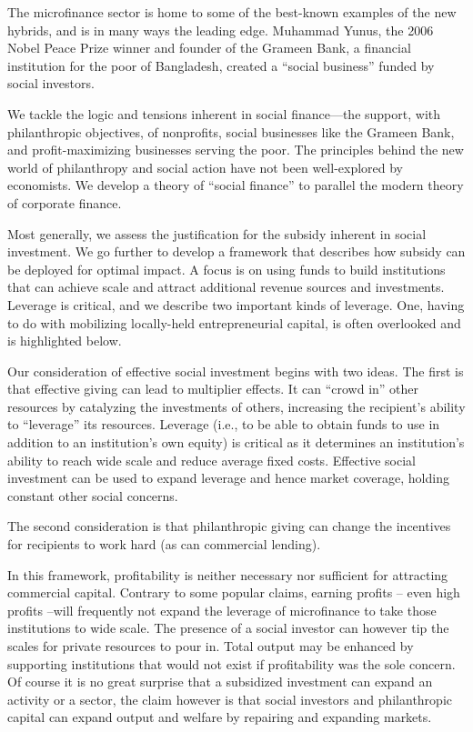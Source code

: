 \documentclass[letterpaper, 12pt]{article}
\begin{document}
The microfinance sector is home to some of the best-known examples of the new hybrids, and is in many ways the leading edge. Muhammad Yunus, the 2006 Nobel Peace Prize winner and founder of the Grameen Bank, a financial institution for the poor of Bangladesh, created a ``social business'' funded by social investors.

We tackle the logic and tensions inherent in social finance---the support, with philanthropic objectives, of nonprofits, social businesses
like the Grameen Bank, and profit-maximizing businesses serving the poor. The principles behind the new world of philanthropy and social
action have not been well-explored by economists. We develop a theory of ``social finance'' to parallel the modern theory of corporate finance.


Most generally, we assess the justification for the subsidy inherent in social investment. We go further to develop a framework that describes
how subsidy can be deployed for optimal impact. A focus is on using funds to build institutions that can achieve scale and attract additional revenue sources and investments. Leverage is critical, and we describe two important kinds of leverage. One, having to do with mobilizing locally-held entrepreneurial capital, is often overlooked and is highlighted below.

Our consideration of effective social investment begins with two ideas. The first is that effective giving can lead to multiplier effects. It can ``crowd in'' other resources by catalyzing the investments of others, increasing the recipient's ability to ``leverage'' its resources. Leverage (i.e., to be able to obtain funds to use in addition to an institution's own equity) is critical as it determines an institution's ability to reach wide scale and reduce average fixed costs. Effective social investment can be used to expand leverage and hence market coverage, holding constant other social concerns.

The second consideration is that philanthropic giving can change the incentives for recipients to work hard (as can commercial lending).

In this framework, profitability is neither necessary nor sufficient for attracting commercial capital. Contrary to some popular claims, earning profits -- even high profits --will frequently not expand the leverage
of microfinance to take those institutions to wide scale. The presence of a social investor can however tip the scales for private resources to
pour in. Total output may be enhanced by supporting institutions that would not exist if profitability was the sole concern. Of course it is no great surprise that a subsidized investment can expand an activity or a sector, the claim however is that social investors and philanthropic
capital can expand output and welfare by repairing and expanding markets.
\end{document}
